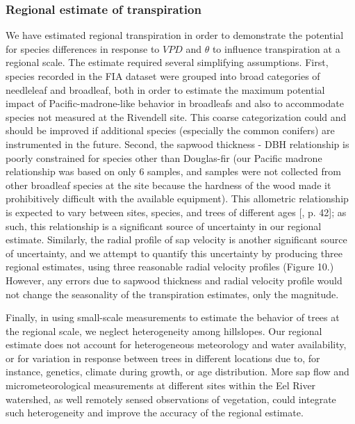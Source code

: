 \subsubsection{Regional estimate of transpiration}
We have estimated regional transpiration in order to demonstrate the potential for species differences in response to $VPD$ and $\theta$ to influence transpiration at a regional scale.  The estimate required several simplifying assumptions.  First, species recorded in the FIA dataset were grouped into broad categories of needleleaf and broadleaf, both in order to estimate the maximum potential impact of Pacific-madrone-like behavior in broadleafs and also to accommodate species not measured at the Rivendell site.  This coarse categorization could and should be improved if additional species (especially the common conifers) are instrumented in the future.  Second, the sapwood thickness - DBH relationship is poorly constrained for species other than Douglas-fir (our Pacific madrone relationship was based on only 6 samples, and samples were not collected from other broadleaf species at the site because the hardness of the wood made it prohibitively difficult with the available equipment).  This allometric relationship is expected to vary between sites, species, and trees of different ages [\cite{eamus}, p. 42]; as such, this relationship is a significant source of uncertainty in our regional estimate.  Similarly, the radial profile of sap velocity is another significant source of uncertainty, and we attempt to quantify this uncertainty by producing three regional estimates, using three reasonable radial velocity profiles (Figure 10.)  However, any errors due to sapwood thickness and radial velocity profile would not change the seasonality of the transpiration estimates, only the magnitude.

Finally, in using small-scale measurements to estimate the behavior of trees at the regional scale, we neglect heterogeneity among hillslopes.  Our regional estimate does not account for heterogeneous meteorology and water availability, or for variation in response between trees in different locations due to, for instance, genetics, climate during growth, or age distribution.  More sap flow and micrometeorological measurements at different sites within the Eel River watershed, as well remotely sensed observations of vegetation, could integrate such heterogeneity and improve the accuracy of the regional estimate.

